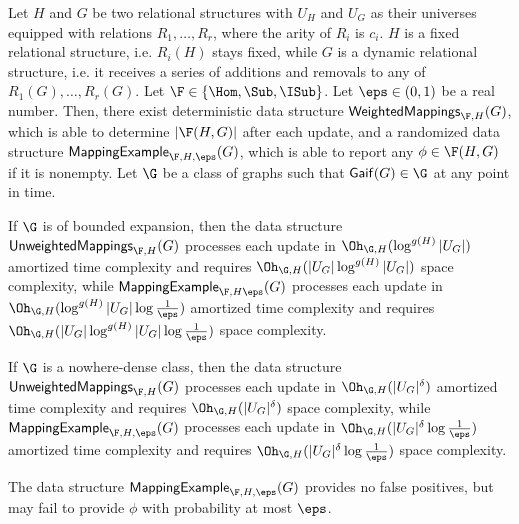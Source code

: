 \begin{theorem}\label{thm:homcounts-relational}
	Let $H$ and $G$ be two relational structures with $U_H$ and $U_G$ as their universes equipped with relations $R_1, \ldots, R_r$, where the arity of $R_i$ is $c_i$. $H$ is a fixed relational structure, i.e. $R_i(H)$ stays fixed, while $G$ is a dynamic relational structure, i.e. it receives a series of additions and removals to any of $R_1(G), \ldots, R_r(G)$. Let $\F \in \{\Hom, \Sub, \ISub\}$. Let $\eps \in (0, 1)$ be a real number. Then, there exist deterministic data structure $\mathsf{WeightedMappings}_{\F, H}(G)$, which is able to determine $|\F(H, G)|$ after each update, and a randomized data structure $\mathsf{MappingExample}_{\F, H, \eps}(G)$, which is able to report any $\phi \in \F(H, G)$ if it is nonempty. Let $\G$ be a class of graphs such that $\mathsf{Gaif}(G) \in \G$ at any point in time.
	
	If $\G$ is of bounded expansion, then the data structure $\mathsf{UnweightedMappings}_{\F, H}(G)$ processes each update in $\Oh_{\G, H}(\log^{g(H)} |U_G|)$ amortized time complexity and requires $\Oh_{\G, H}(|U_G| \log^{g(H)} |U_G|)$ space complexity, while $\mathsf{MappingExample}_{\F, H \eps}(G)$ processes each update in $\Oh_{\G, H}(\log^{g(H)} |U_G| \log{\frac{1}{\eps}})$ amortized time complexity and requires $\Oh_{\G, H}(|U_G| \log^{g(H)} |U_G| \log{\frac{1}{\eps}})$ space complexity. 
	
	If $\G$ is a nowhere-dense class, then the data structure $\mathsf{UnweightedMappings}_{\F, H}(G)$ processes each update in $\Oh_{\G, H}(|U_G|^\delta)$ amortized time complexity and requires $\Oh_{\G, H}(|U_G|^\delta)$ space complexity, while $\mathsf{MappingExample}_{\F, H, \eps}(G)$ processes each update in $\Oh_{\G, H}(|U_G|^\delta \log{\frac{1}{\eps}})$ amortized time complexity and requires $\Oh_{\G, H}(|U_G|^\delta \log{\frac{1}{\eps}})$ space complexity. 
	
	The data structure $\mathsf{MappingExample}_{\F, H, \eps}(G)$ provides no false positives, but may fail to provide $\phi$ with probability at most $\eps$.
\end{theorem}

